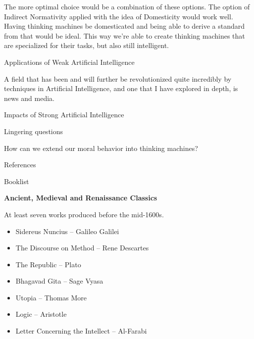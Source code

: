 \documentclass[11pt]{article}
\begin{document}
\par The more optimal choice would be a combination of these options. The option of Indirect Normativity applied with the idea of Domesticity would work well. Having thinking machines be domesticated and being able to derive a standard from that would be ideal. This way we're able to create thinking machines that are specialized for their tasks, but also still intelligent.

\begin{center}
	{\large Applications of Weak Artificial Intelligence\par}
\end{center}

\par A field that has been and will further be revolutionized quite incredibly by techniques in Artificial Intelligence, and one that I have explored in depth, is news and media.

\begin{center}
	{\large Impacts of Strong Artificial Intelligence\par}
\end{center}

\par 

\begin{center}
	{\large Lingering questions\par}
\end{center}

\par How can we extend our moral behavior into thinking machines?

\begin{center}
	{\large References\par}
\end{center}

\newpage

{\Large Booklist\\\par}

\par \textbf{Ancient, Medieval and Renaissance Classics}
\par At least seven works produced before the mid-1600s.
\begin{itemize}
	\item Sidereus Nuncius ­-- Galileo Galilei
	\item The Discourse on Method -- Rene Descartes
	\item The Republic -- Plato
	\item Bhagavad Gita -- Sage Vyasa
	\item Utopia -- Thomas More
	\item Logic -- Aristotle
	\item Letter Concerning the Intellect -- Al-Farabi
\end{itemize}
\end{document}
